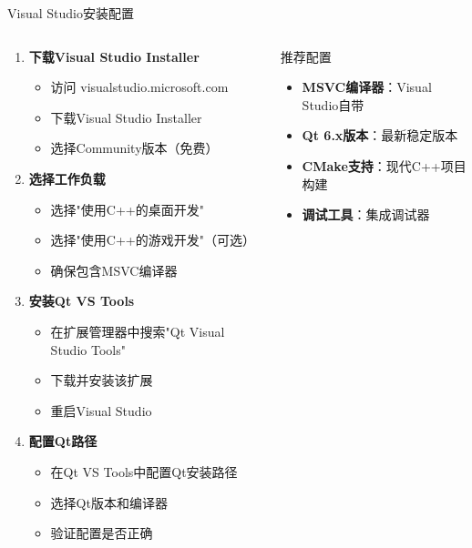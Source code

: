 \documentclass[UTF8,aspectratio=169]{beamer}
\begin{document}
\begin{frame}{Visual Studio安装配置}
    \begin{columns}
        \begin{column}{0.6\textwidth}
            \begin{enumerate}
                \item \textbf{下载Visual Studio Installer}
                    \begin{itemize}
                        \item 访问 visualstudio.microsoft.com
                        \item 下载Visual Studio Installer
                        \item 选择Community版本（免费）
                    \end{itemize}
                \item \textbf{选择工作负载}
                    \begin{itemize}
                        \item 选择"使用C++的桌面开发"
                        \item 选择"使用C++的游戏开发"（可选）
                        \item 确保包含MSVC编译器
                    \end{itemize}
                \item \textbf{安装Qt VS Tools}
                    \begin{itemize}
                        \item 在扩展管理器中搜索"Qt Visual Studio Tools"
                        \item 下载并安装该扩展
                        \item 重启Visual Studio
                    \end{itemize}
                \item \textbf{配置Qt路径}
                    \begin{itemize}
                        \item 在Qt VS Tools中配置Qt安装路径
                        \item 选择Qt版本和编译器
                        \item 验证配置是否正确
                    \end{itemize}
            \end{enumerate}
        \end{column}
        \begin{column}{0.4\textwidth}
            \begin{ytublock}{推荐配置}
                \begin{itemize}
                    \item \textbf{MSVC编译器}：Visual Studio自带
                    \item \textbf{Qt 6.x版本}：最新稳定版本
                    \item \textbf{CMake支持}：现代C++项目构建
                    \item \textbf{调试工具}：集成调试器
                \end{itemize}
            \end{ytublock}


\end{column}
\end{columns}
\end{frame}
\end{document}
